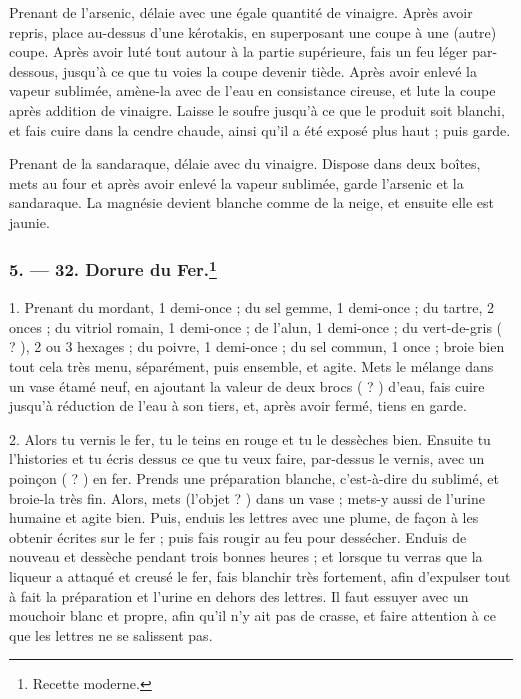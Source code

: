 \documentclass[a4paper, 11pt, oneside, polutonikogreek, french]{article}
\begin{document}
Prenant de l'arsenic, délaie avec une égale quantité de vinaigre. Après avoir repris, place au-dessus d'une kérotakis, en superposant une coupe à une (autre) coupe. Après avoir luté tout autour à la partie supérieure, fais un feu léger par-dessous, jusqu'à ce que tu voies la coupe devenir tiède. Après avoir enlevé la vapeur sublimée, amène-la avec de l'eau en consistance cireuse, et lute la coupe après addition de vinaigre. Laisse le soufre jusqu'à ce que le produit soit blanchi, et fais cuire dans la cendre chaude, ainsi qu'il a été exposé plus haut ; puis garde.

Prenant de la sandaraque, délaie avec du vinaigre. Dispose dans deux boîtes, mets au four et après avoir enlevé la vapeur sublimée, garde l'arsenic et la sandaraque. La magnésie devient blanche comme de la neige, et ensuite elle est jaunie.

\bigskip
\centerline{\EightStarTaper}
\centerline{\EightStarTaper\EightStarTaper}
\bigskip

\subsubsection[5. --- 32. Dorure du Fer.]{5. --- 32. Dorure du Fer.\footnote{Recette moderne.}}

1. Prenant du mordant, 1 demi-once ; du sel gemme, 1 demi-once ; du tartre, 2 onces ; du vitriol romain, 1 demi-once ; de l'alun, 1 demi-once ; du vert-de-gris ( ? ), 2 ou 3 hexages ; du poivre, 1 demi-once ; du sel commun, 1 once ; broie bien tout cela très menu, séparément, puis ensemble, et agite. Mets le mélange dans un vase étamé neuf, en ajoutant la valeur de deux brocs ( ? ) d'eau, fais cuire jusqu'à réduction de l'eau à son tiers, et, après avoir fermé, tiens en garde.

2. Alors tu vernis le fer, tu le teins en rouge et tu le dessèches bien. Ensuite tu l'histories et tu écris dessus ce que tu veux faire, par-dessus le vernis, avec un poinçon ( ? ) en fer. Prends une préparation blanche, c'est-à-dire du sublimé, et broie-la très fin. Alors, mets (l'objet ? ) dans un vase ; mets-y aussi de l'urine humaine et agite bien. Puis, enduis les lettres avec une plume, de façon à les obtenir écrites sur le fer ; puis fais rougir au feu pour dessécher. Enduis de nouveau et dessèche pendant trois bonnes heures ; et lorsque tu verras que la liqueur a attaqué et creusé le fer, fais blanchir très fortement, afin d'expulser tout à fait la préparation et l'urine en dehors des lettres. Il faut essuyer avec un mouchoir blanc et propre, afin qu'il n'y ait pas de crasse, et faire attention à ce que les lettres ne se salissent pas.
\end{document}
